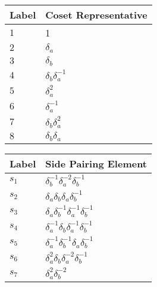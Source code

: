 \documentclass{article}
\begin{document}
\begin{center}
\begin{tabular}{ll}
\toprule
Label & Coset Representative\\
\midrule
$1$ & 1 \\
$2$ & $\delta_a^{}$ \\
$3$ & $\delta_b^{}$ \\
$4$ & $\delta_b^{}\delta_a^{-1}$ \\
$5$ & $\delta_a^{2}$ \\
$6$ & $\delta_a^{-1}$ \\
$7$ & $\delta_b^{}\delta_a^{2}$ \\
$8$ & $\delta_b^{}\delta_a^{}$ \\
\bottomrule
\end{tabular}
\hfill
\begin{tabular}{ll}
\toprule
Label & Side Pairing Element\\
\midrule
$s_{1}$ & $\delta_b^{-1}\delta_a^{-2}\delta_b^{-1}$ \\
$s_{2}$ & $\delta_a^{}\delta_b^{}\delta_a^{}\delta_b^{-1}$ \\
$s_{3}$ & $\delta_a^{}\delta_b^{-1}\delta_a^{-1}\delta_b^{-1}$ \\
$s_{4}$ & $\delta_a^{-1}\delta_b^{}\delta_a^{-1}\delta_b^{-1}$ \\
$s_{5}$ & $\delta_a^{-1}\delta_b^{-1}\delta_a^{}\delta_b^{-1}$ \\
$s_{6}$ & $\delta_a^{2}\delta_b^{}\delta_a^{-2}\delta_b^{-1}$ \\
$s_{7}$ & $\delta_a^{2}\delta_b^{-2}$ \\
\bottomrule
\end{tabular}
\end{center}

\thispagestyle{empty}
\end{document}

